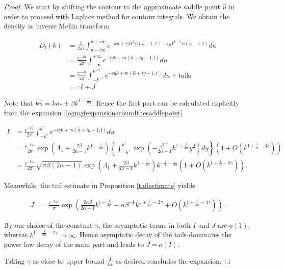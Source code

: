 \documentclass[12pt]{article}
\theoremstyle{plain}
\begin{document}
\begin{proof}

We start by shifting the contour to the approximate saddle point $\hat u$ in order to proceed with Laplace method for contour integrals. We obtain the density as inverse Mellin transform

$$
\begin{aligned}
D_t(k) &= \frac{1}{2\pi i} \int_{\hat u -i\infty}^{\hat u + i\infty} e^{-ku+\bar{v} \lambda I^{1} \psi(u-1, t)+v_{0} I^{1-\alpha} \psi(u-1, t)}du \\[10pt]
&=\frac{e^{-k\hat u}}{2\pi } \int_{-\infty}^{ + \infty} e^{-iyk+m(\hat u + iy - 1, t)}du\\[10pt]
&=\frac{e^{-k\hat u}}{2\pi } \int_{-k^{-\gamma}}^{ k^{-\gamma}} e^{-iyk+m(\hat u + iy - 1, t)}du + \text{tails}\\[10pt]
&=:I+J
\end{aligned}
$$

Note that $k\hat u = k u_* + \beta k ^{1-\frac{1}{2\alpha}}$. Hence the first part can be calculated explicitly from the expansion \eqref{logmgfexpansionaroundthesaddlepoint}

$$
\begin{aligned}
I &= \frac{e^{-k\hat u}}{2\pi} \int_{-k^\gamma}^{ k^\gamma} e^{-iyk+m(\hat u + iy - 1, t)}du\\
&=\frac{e^{-k u_*}}{2\pi}\exp\left(\Lambda_1 + \frac{2\beta}{2\alpha - 1}k^{1-\frac{1}{2\alpha}}\right)\left\{\int _{-k^\gamma} ^{k^\gamma} \exp\left(-\frac{\beta^{-1}}{2\alpha-1} k ^{1+\frac{1}{2\alpha}} y^2\right) dy\right\} \left(1+O(k^{1+\frac 1\alpha -3\gamma})\right)\\[5pt]
&=\frac{e^{-k u_*}}{2\pi} \sqrt {\pi\beta(2\alpha-1)} \exp\left(\Lambda_1 + \frac{2\beta}{2\alpha - 1}k^{1-\frac{1}{2\alpha}}\right) k^{-\frac 12 -\frac{1}{4\alpha}} \left(1+O(k^{1+\frac 1\alpha -3\gamma})\right).
\end{aligned}
$$

Meanwhile, the tail estimate in Proposition \ref{tailestimate} yields

$$
\begin{aligned}
J &= \frac {e^{-ku_*}}{\pi} \exp\left( \frac{2\alpha\beta}{2\alpha-1} k^{1-\frac{1}{2\alpha}}-  \alpha\beta^{-1}k^{1+\frac{1}{2\alpha} -2\gamma} + O(k^{1+\frac{3}{2\alpha} - 4\gamma}) \right).
\end{aligned}
$$

By our choice of the constant $\gamma$, the asymptotic terms in both $I$ and $J$ are $o(1)$, whereas $k^{1+\frac{1}{2\alpha} -2\gamma}\rightarrow \infty$. Hence asymptotic decay of the tails dominates the power law decay of the main part and leads to $J=o(I)$.

Taking $\gamma$ as close to upper bound $\frac{3}{4\alpha}$ as desired concludes the expansion.

\end{proof}
\end{document}
